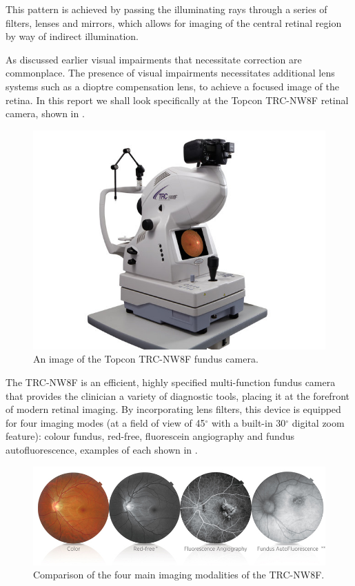 This pattern is achieved by passing the illuminating rays through
a series of filters, lenses and mirrors,  which allows for imaging of
the central retinal region by way of indirect illumination. 

As discussed earlier visual impairments that necessitate correction
are commonplace. The presence of visual impairments necessitates
additional lens systems such as a dioptre compensation lens, to
achieve a focused image of the retina. In this report we shall look
specifically at the Topcon TRC-NW8F retinal camera, shown in .

\begin{figure}[H]
\centering
\includegraphics{figures/trc}
\caption{An image of the Topcon TRC-NW8F fundus camera.\cite{1_topconmedical.com_2015}}
\label{fig:trc}
\end{figure}


The TRC-NW8F is an efficient, highly specified multi-function fundus
camera that provides the clinician a variety of diagnostic tools, placing
it at the forefront of modern retinal imaging. By incorporating lens filters,
this device is equipped for four imaging modes (at a field of view of
45$^\circ$ with a built-in 30$^\circ$ digital zoom feature): colour fundus,
red-free, fluorescein angiography and fundus autofluorescence, examples
of each shown in .

\begin{figure}[H]
\centering
\includegraphics{figures/imagingmodes}
\caption{Comparison of the four main imaging modalities of the TRC-NW8F.\cite{1_topconmedical.com_2015}}
\label{fig:im}
\end{figure}


